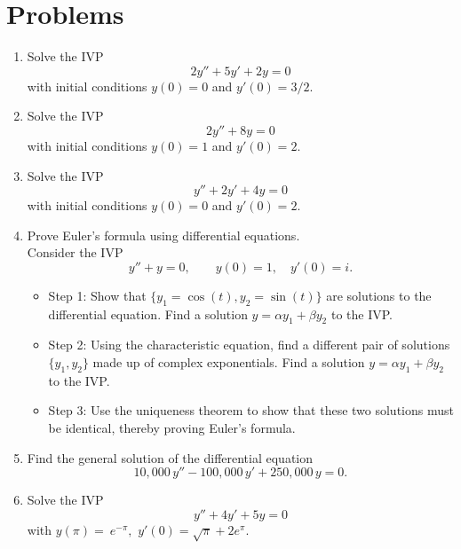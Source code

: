 \documentclass[10pt,driverfallback=hypertex]{report}
\begin{document}
\section{Problems}

\begin{enumerate}

\item
  Solve the IVP
  \begin{dmath*}
    2 y'' + 5y' + 2y =0
  \end{dmath*}
  with initial conditions $y(0)=0$ and $y'(0)=3/2$.

\item
  Solve the IVP
  \begin{dmath*}
    2 y'' + 8y =0
  \end{dmath*}
  with initial conditions $y(0)=1$ and $y'(0)=2$.

\item
  Solve the IVP
  \begin{dmath*}
    y'' + 2y' + 4y=0
  \end{dmath*}
  with initial conditions $y(0)=0$ and $y'(0)=2$.

\item
  Prove Euler's formula using differential equations. \\
  Consider the IVP
  \begin{dmath*}[compact]
    y'' +y =0, \qquad y(0)=1, \quad y'(0)=i.
  \end{dmath*}
  \begin{itemize}
    \item Step 1: Show that $\{y_1=\cos(t),y_2=\sin(t)\}$ are solutions
      to the differential equation. Find a solution $y=\alpha y_1 + \beta y_2$
      to the IVP.
    \item Step 2: Using the characteristic equation, find a different pair
      of solutions $\{y_1,y_2\}$ made up of complex exponentials. Find a
      solution $y=\alpha y_1 + \beta y_2$ to the IVP.
    \item Step 3: Use the uniqueness theorem to show that these two
      solutions must be identical, thereby proving Euler's formula.
  \end{itemize}

\item
  Find the general solution of the differential equation
  \begin{dmath*}
  10, \! 000 \, y'' - 100, \! 000 \, y' + 250, \! 000 \, y = 0.
  \end{dmath*}


\item
  Solve the IVP
  \begin{dmath*}
    y'' + 4y' + 5y = 0
  \end{dmath*}
  with $y(\pi) =\ e^{-\pi},$ $y' (0) = \sqrt{\pi} + 2e^\pi$.

\end{enumerate}
\end{document}
